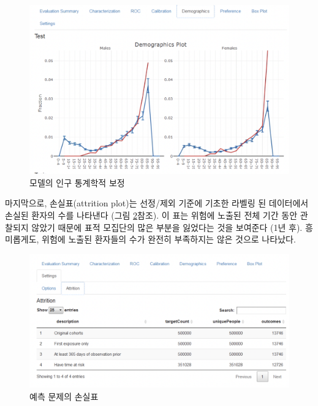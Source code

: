 \documentclass[11pt]{book}
\theoremstyle{definition}
\theoremstyle{definition}
\theoremstyle{definition}
\theoremstyle{remark}
\begin{document}
\begin{figure}

{\centering \includegraphics[width=1\linewidth]{images/PatientLevelPrediction/shiny/singleShiny/singleShinyDemo} 

}

\caption{모델의 인구 통계학적 보정}\label{fig:shinyDemo}
\end{figure}

마지막으로, 손실표(attrition plot)는 선정/제외 기준에 기초한 라벨링 된
데이터에서 손실된 환자의 수를 나타낸다 (그림 \ref{fig:shinyAtt}참조). 이
표는 위험에 노출된 전체 기간 동안 관찰되지 않았기 때문에 표적 모집단의
많은 부분을 잃었다는 것을 보여준다 (1년 후). 흥미롭게도, 위험에 노출된
환자들의 수가 완전히 부족하지는 않은 것으로 나타났다.

\begin{figure}

{\centering \includegraphics[width=1\linewidth]{images/PatientLevelPrediction/shiny/singleShiny/singleShinyAtt} 

}

\caption{예측 문제의 손실표}\label{fig:shinyAtt}
\end{figure}
\end{document}
